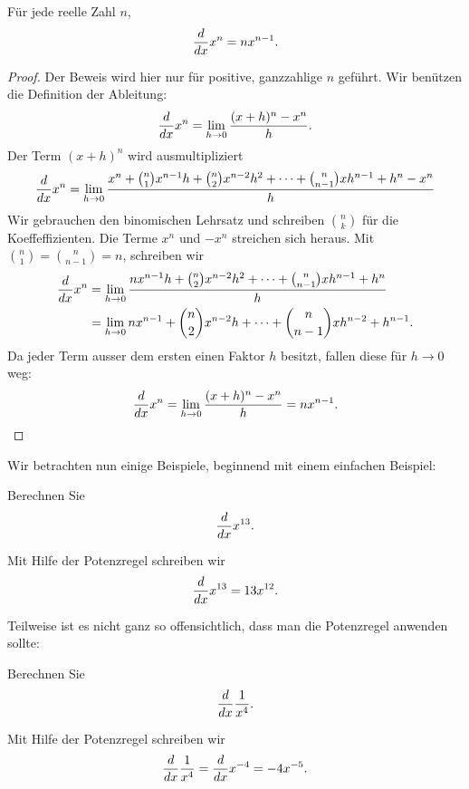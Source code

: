 \begin{mainTheorem}[Potenzregel]\label{T:powerrule}
Für jede reelle Zahl $n$, 
\[
\frac{d}{dx} x^n = n x^{n-1}.
\]
\end{mainTheorem}
\begin{proof}
Der Beweis wird hier nur für positive, ganzzahlige $n$ geführt. Wir benützen die Definition der Ableitung:
\[
\frac{d}{dx} x^n = \lim_{ h\to0} \frac{(x+ h)^n-x^n}{h}.
\]
Der Term $(x+h)^n$ wird ausmultipliziert
\[
\frac{d}{dx} x^n=\lim_{h\to0} \frac{x^n + \binom{n}{1}x^{n-1} h + \binom{n}{2}x^{n-2} h^2+\cdots+\binom{n}{n-1}x h^{n-1} +  h^n-x^n}{h}
\]
Wir gebrauchen den binomischen Lehrsatz und schreiben $\binom{n}{k}$ für die Koeffeffizienten. Die Terme $x^{n}$ und $-x^{n}$ streichen sich heraus. Mit 
$\binom{n}{1}= \binom{n}{n-1}= n$, schreiben wir
\begin{align*}
\frac{d}{dx} x^n&=\lim_{h\to0} \frac{nx^{n-1} h + \binom{n}{2}x^{n-2} h^2+\cdots+\binom{n}{n-1}x h^{n-1} +  h^n}{h} \\
&=\lim_{h\to0} nx^{n-1} + \binom{n}{2}x^{n-2} h+\cdots+\binom{n}{n-1}x h^{n-2} +  h^{n-1}.
\end{align*}
Da jeder Term ausser dem ersten einen Faktor $h$ besitzt, fallen diese für $h \to 0$ weg:
\[
\frac{d}{dx} x^n = \lim_{ h\to0}\frac{(x+ h)^n-x^n}{h} = nx^{n-1}.
\]
\end{proof}

Wir betrachten nun einige Beispiele, beginnend mit einem einfachen Beispiel:

\begin{example}
Berechnen Sie
\[
\frac{d}{dx} x^{13}.
\]
\end{example}
\begin{solution}
Mit Hilfe der Potenzregel schreiben wir
\[
\frac{d}{dx} x^{13} = 13x^{12}.
\]
\end{solution}

Teilweise ist es nicht ganz so offensichtlich, dass man die Potenzregel anwenden sollte:

\begin{example}
Berechnen Sie
\[
\frac{d}{dx} \frac{1}{x^4}.
\]
\end{example}
\begin{solution}
Mit Hilfe der Potenzregel schreiben wir
\[
\frac{d}{dx} \frac{1}{x^4} = \frac{d}{dx} x^{-4} = -4x^{-5}.
\]
\end{solution}

